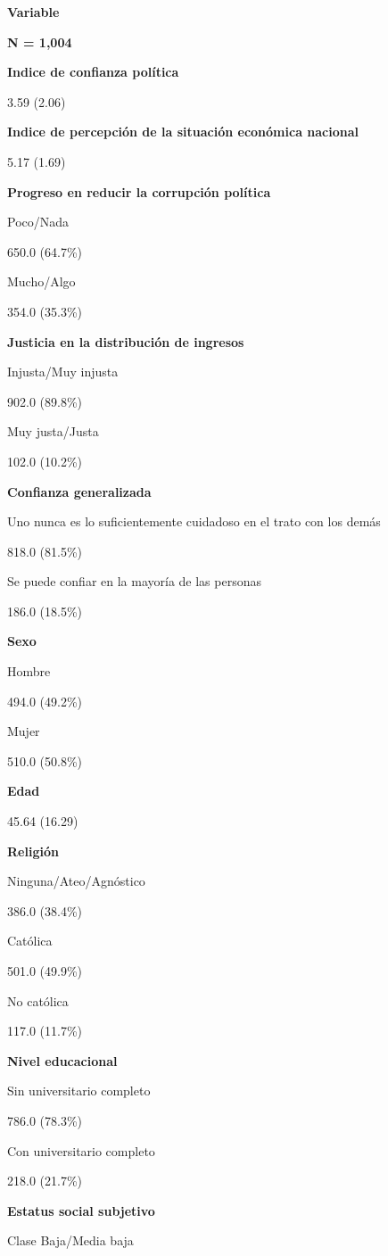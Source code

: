 \documentclass[12pt,twoside]{templates/facsothesis}
\begin{document}
\textbf{Variable}

\textbf{N = 1,004}

\textbf{Indice de confianza política}

3.59 (2.06)

\textbf{Indice de percepción de la situación económica nacional}

5.17 (1.69)

\textbf{Progreso en reducir la corrupción política}

Poco/Nada

650.0 (64.7\%)

Mucho/Algo

354.0 (35.3\%)

\textbf{Justicia en la distribución de ingresos}

Injusta/Muy injusta

902.0 (89.8\%)

Muy justa/Justa

102.0 (10.2\%)

\textbf{Confianza generalizada}

Uno nunca es lo suficientemente cuidadoso en el trato con los demás

818.0 (81.5\%)

Se puede confiar en la mayoría de las personas

186.0 (18.5\%)

\textbf{Sexo}

Hombre

494.0 (49.2\%)

Mujer

510.0 (50.8\%)

\textbf{Edad}

45.64 (16.29)

\textbf{Religión}

Ninguna/Ateo/Agnóstico

386.0 (38.4\%)

Católica

501.0 (49.9\%)

No católica

117.0 (11.7\%)

\textbf{Nivel educacional}

Sin universitario completo

786.0 (78.3\%)

Con universitario completo

218.0 (21.7\%)

\textbf{Estatus social subjetivo}

Clase Baja/Media baja
\end{document}
